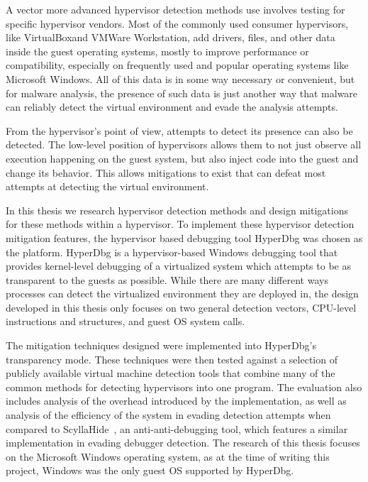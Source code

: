 A vector more advanced hypervisor detection methods use involves testing for specific hypervisor vendors. Most of the commonly used consumer hypervisors, like VirtualBox\texttrademark and VMWare Workstation\texttrademark, 
add drivers, files, and other data inside the guest operating systems, mostly to improve performance or compatibility, especially on frequently used and popular operating systems like Microsoft Windows. 
All of this data is in some way necessary or convenient, but for malware analysis, the presence of such data is just another way that malware can reliably detect the virtual environment and evade the analysis attempts.

From the hypervisor's point of view, attempts to detect its presence can also be detected. The low-level position of hypervisors allows them to not just observe all execution happening on the guest system, 
but also inject code into the guest and change its behavior. This allows mitigations to exist that can defeat most attempts at detecting the virtual environment.

In this thesis we research hypervisor detection methods and design mitigations for these methods within a hypervisor. To implement these hypervisor detection mitigation features, 
the hypervisor based debugging tool HyperDbg was chosen as the platform. HyperDbg is a hypervisor-based Windows debugging tool that provides kernel-level debugging of a virtualized system which attempts to be as transparent to the guests as possible.
While there are many different ways processes can detect the virtualized environment they are deployed in, the design developed in this thesis only focuses on two general detection vectors, 
CPU-level instructions and structures, and guest OS system calls.

The mitigation techniques designed were implemented into HyperDbg's transparency mode. 
These techniques were then tested against a selection of publicly available virtual machine detection tools that combine many of the common methods for detecting hypervisors into one program. 
The evaluation also includes analysis of the overhead introduced by the implementation, as well as analysis of the efficiency of the system in evading detection attempts when compared to ScyllaHide~\cite{scyllahide}, an anti-anti-debugging tool, which features a similar implementation in evading debugger detection.
The research of this thesis focuses on the Microsoft Windows operating system, as at the time of writing this project, Windows was the only guest OS supported by HyperDbg.

